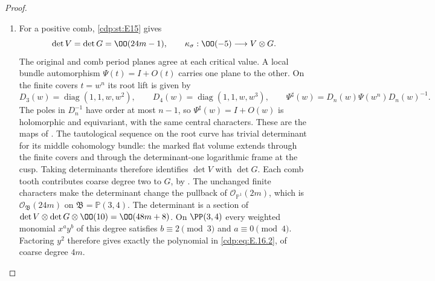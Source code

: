 \begin{proof}
\begin{enumerate}[label=\arabic*.,leftmargin=*]
\item For a positive comb, \ref{cdp:st:E15} gives
\[
 \det V=\det G=\OO(24m-1),\qquad
 \kappa_\sigma:\OO(-5)\longrightarrow V\otimes G.
\]
The original and comb period planes agree at each critical value.
A local bundle automorphism $\Psi(t)=I+O(t)$ carries one plane to
the other. On the finite covers $t=w^n$ its root lift is given by
\[
 D_3(w)=\operatorname{diag}(1,1,w,w^2),\qquad
 D_4(w)=\operatorname{diag}(1,1,w,w^3),\qquad
 \Psi^\sharp(w)=D_n(w)\Psi(w^n)D_n(w)^{-1}.
\]
The poles in $D_n^{-1}$ have order at most $n-1$, so
$\Psi^\sharp(w)=I+O(w)$ is holomorphic and equivariant, with the
same central characters. These are the maps of
\cite[Proposition~6.2, pp.~22--23]{Viaclovsky2026Combs}.
The tautological sequence on the root curve has trivial determinant
for its middle cohomology bundle: the marked flat volume extends
through the finite covers and through the determinant-one logarithmic
frame at the cusp. Taking determinants therefore identifies
$\det V$ with $\det G$. Each comb tooth contributes coarse degree
two to $G$, by \cite[equation~(5.5), p.~16]{Viaclovsky2026Combs}.
The unchanged finite characters make the determinant change the
pullback of $\mathcal O_{\mathbb P^1}(2m)$, which is
$\mathcal O_{\mathfrak B}(24m)$ on $\mathfrak B=\mathbb P(3,4)$.
The determinant is a section of $\det V\otimes\det G\otimes\OO(10)=\OO(48m+8)$. On $\PP(3,4)$ every weighted monomial $x^ay^b$ of this degree satisfies $b\equiv2\pmod3$ and $a\equiv0\pmod4$. Factoring $y^2$ therefore gives exactly the polynomial in \eqref{cdp:eq:E.16.2}, of coarse degree $4m$.


\end{enumerate}
\end{proof}
